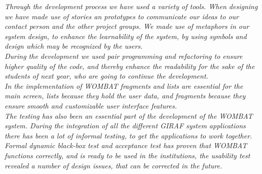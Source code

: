 \textit{Through the development process we have used a variety of tools.
When designing we have made use of stories an prototypes to communicate our ideas to our contact person and the other project groups.
We made use of metaphors in our system design, to enhance the learnability of the system, by using symbols and design which may be recognized by the users.}\\

\textit{During the development we used pair programming and refactoring to ensure higher quality of the code, and thereby enhance the readability for the sake of the students of next year, who are going to continue the development.}\\

\textit{In the implementation of WOMBAT fragments and lists are essential for the main screen, lists because they hold the user data, and fragments because they ensure smooth and customizable user interface features.}\\

\textit{The testing has also been an essential part of the development of the WOMBAT system.
During the integration of all the different GIRAF system applications there has been a lot of informal testing, to get the applications to work together.}\\

\textit{Formal dynamic black-box test and acceptance test has proven that WOMBAT functions correctly, and is ready to be used in the institutions, the usability test revealed a number of design issues, that can be corrected in the future.}
